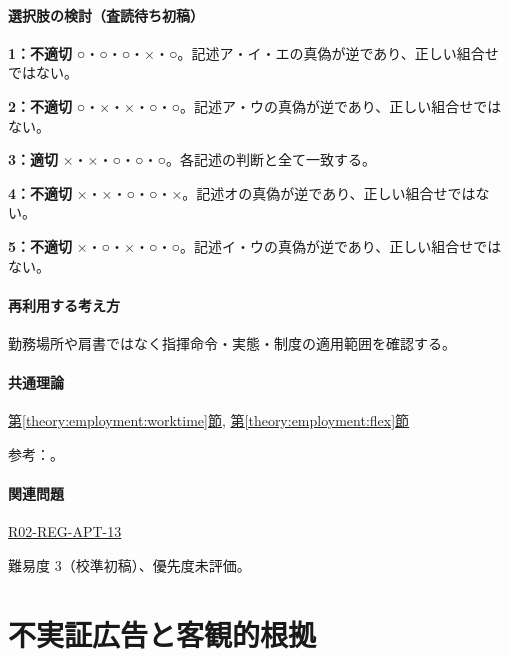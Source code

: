 \paragraph{選択肢の検討（査読待ち初稿）}\mbox{}\par

\noindent\textbf{1：不適切} ○・○・○・×・○。記述ア・イ・エの真偽が逆であり、正しい組合せではない。\par

\noindent\textbf{2：不適切} ○・×・×・○・○。記述ア・ウの真偽が逆であり、正しい組合せではない。\par

\noindent\textbf{3：適切} ×・×・○・○・○。各記述の判断と全て一致する。\par

\noindent\textbf{4：不適切} ×・×・○・○・×。記述オの真偽が逆であり、正しい組合せではない。\par

\noindent\textbf{5：不適切} ×・○・×・○・○。記述イ・ウの真偽が逆であり、正しい組合せではない。\par

\paragraph{再利用する考え方} 勤務場所や肩書ではなく指揮命令・実態・制度の適用範囲を確認する。

\paragraph{共通理論} \hyperref[theory:employment:worktime]{第\ref*{theory:employment:worktime}節}, \hyperref[theory:employment:flex]{第\ref*{theory:employment:flex}節}

\par 参考：\cite{employment_hours2017,employment_manager2008,employment_reform2018,employment_worklife2010}。

\paragraph{関連問題} \hyperref[q:r02-reg-apt-13]{R02-REG-APT-13}

\par 難易度 3（校準初稿）、優先度未評価。

\section{不実証広告と客観的根拠}

